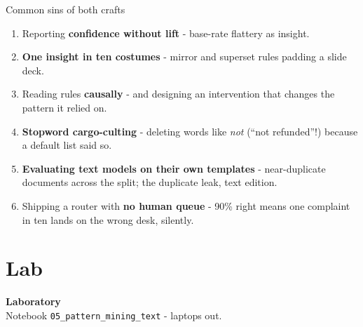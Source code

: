 \documentclass[10pt,aspectratio=169]{beamer}
\begin{document}
\begin{frame}{Common sins of both crafts}
  \begin{enumerate}
    \item Reporting \textbf{confidence without lift} - base-rate
          flattery as insight.
    \item \textbf{One insight in ten costumes} - mirror and superset
          rules padding a slide deck.
    \item Reading rules \textbf{causally} - and designing an
          intervention that changes the pattern it relied on.
    \item \textbf{Stopword cargo-culting} - deleting words like
          \emph{not} (``not refunded''!) because a default list said so.
    \item \textbf{Evaluating text models on their own templates} -
          near-duplicate documents across the split; the duplicate leak,
          text edition.
    \item Shipping a router with \textbf{no human queue} - 90\% right
          means one complaint in ten lands on the wrong desk, silently.
  \end{enumerate}
\end{frame}

\section{Lab}

\begin{frame}[plain]
  \begin{center}
    \vspace{1.5cm}
    {\LARGE\textbf{Laboratory}}\\[0.6cm]
    {\normalsize Notebook \texttt{05\_pattern\_mining\_text} - laptops out.}
  \end{center}
\end{frame}
\end{document}

